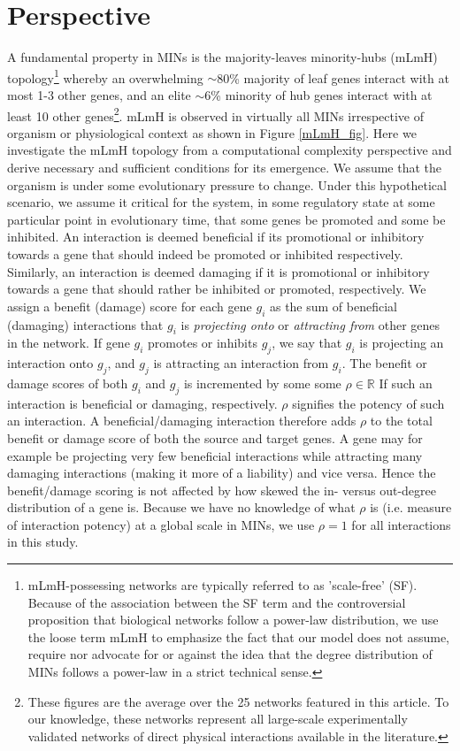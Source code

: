 \section{Perspective}
        A fundamental property in MINs is the majority-leaves minority-hubs  (mLmH) topology\footnote{
            mLmH-possessing networks are typically referred to as 'scale-free' (SF). Because of the association between the SF term and the controversial proposition \cite{arita_metabolic_2004, tanaka_protein_2005, fox_keller_revisiting_2005, khanin_how_2006} that biological networks follow a power-law distribution, we use the loose term mLmH to emphasize the fact that our model does not assume, require nor advocate for or against the idea that the degree distribution of MINs follows a power-law in a strict technical sense.}
         whereby an overwhelming ${\sim}$80\% majority of leaf genes interact with at most 1-3 other genes, and an elite ${\sim}$6\% minority of hub genes interact with at least 10 other genes\footnote{
            These figures are the average over the 25 networks featured in this article. To our knowledge, these networks represent all large-scale experimentally validated networks of direct physical interactions available in the literature.
        }.
        mLmH is observed in virtually all MINs irrespective of organism or physiological context as shown in Figure \ref{mLmH_fig}. Here we investigate the mLmH topology from a computational complexity perspective and derive necessary and sufficient conditions for its emergence. We assume that the organism is under some evolutionary pressure to change. Under this hypothetical scenario, we assume it critical for the system, in some regulatory state at some particular point in evolutionary time,  that some genes be promoted and some be inhibited. An interaction is deemed beneficial if its promotional or inhibitory towards a gene that should indeed be promoted or inhibited respectively. Similarly, an interaction is deemed  damaging if it is promotional or inhibitory towards a gene that should rather be inhibited or promoted, respectively. We assign a benefit (damage) score for each gene $g_i$ as the sum of beneficial (damaging) interactions that $g_i$ is \textit{projecting onto} or \textit{attracting  from} other genes in the network. If gene $g_i$ promotes or inhibits $g_j$, we say that $g_i$ is projecting an interaction onto $g_j$, and $g_j$ is attracting an interaction from $g_i$. The benefit or damage scores of both $g_i$ and $g_j$ is incremented by some some $\rho\in\mathbb{R}$ If such an interaction is beneficial or damaging, respectively. $\rho$ signifies the potency of such an interaction. A beneficial/damaging interaction therefore adds $\rho$ to the total benefit or damage score of both the source and target genes. A gene may for example be projecting very few beneficial interactions while attracting many damaging interactions (making it more of a liability) and vice versa. Hence the benefit/damage scoring is not affected by how skewed the in- versus out-degree distribution of a gene is. Because we have no knowledge of what $\rho$ is (i.e. measure of interaction potency) at a global scale in MINs, we use $\rho=1$ for all interactions in this study.

